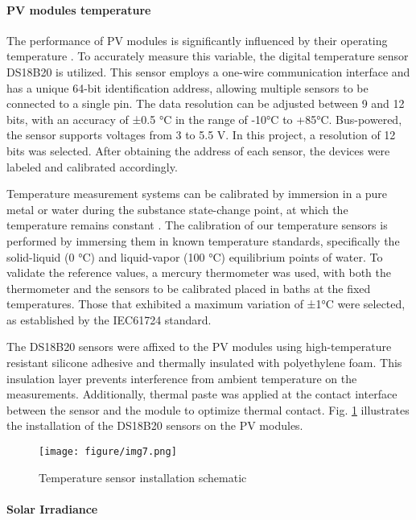 \documentclass{ieeeaccess}
\begin{document}
\paragraph{PV modules temperature}
The performance of PV modules is significantly influenced by their operating temperature \cite{santos2024hybrid}. To accurately measure this variable, the digital temperature sensor DS18B20 is utilized. This sensor employs a one-wire communication interface and has a unique 64-bit identification address, allowing multiple sensors to be connected to a single pin. The data resolution can be adjusted between 9 and 12 bits, with an accuracy of ±0.5 °C in the range of -10°C to +85°C. Bus-powered, the sensor supports voltages from 3 to 5.5 V. In this project, a resolution of 12 bits was selected. After obtaining the address of each sensor, the devices were labeled and calibrated accordingly.

Temperature measurement systems can be calibrated by immersion in a pure metal or water during the substance state-change point, at which the temperature remains constant \cite{bolton2003mechatronics}. The calibration of our temperature sensors is performed by immersing them in known temperature standards, specifically the solid-liquid (0 °C) and liquid-vapor (100 °C) equilibrium points of water. To validate the reference values, a mercury thermometer was used, with both the thermometer and the sensors to be calibrated placed in baths at the fixed temperatures. Those that exhibited a maximum variation of ±1°C were selected, as established by the IEC61724 standard.

The DS18B20 sensors were affixed to the PV modules using high-temperature resistant silicone adhesive and thermally insulated with polyethylene foam. This insulation layer prevents interference from ambient temperature on the measurements. Additionally, thermal paste was applied at the contact interface between the sensor and the module to optimize thermal contact. Fig. \ref{fig:tuboSensor}  illustrates the installation of the DS18B20 sensors on the PV modules.


\begin{figure}[h]
    \centering
    \texttt{[image: figure/img7.png]}
    \caption{Temperature sensor installation schematic}
    \label{fig:tuboSensor}
\end{figure}

\paragraph{Solar Irradiance}
\end{document}
